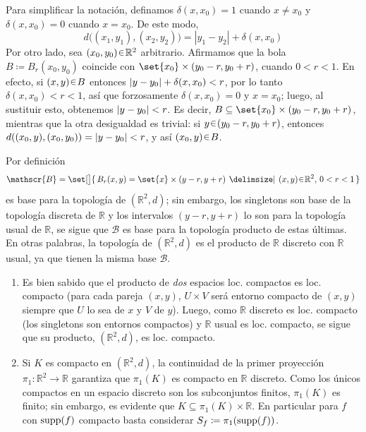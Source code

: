 \begin{sol}
Para simplificar la notación, definamos $\delta(x,x_0) = 1$ cuando $x\neq x_0$ y $\delta(x,x_0) = 0$ cuando $x=x_0$. De este modo, 
\[
d\bigl((x_1, y_1), (x_2, y_2)\bigr) = |y_1 - y_2| + \delta(x,x_0)
\]
Por otro lado, sea $(x_0,y_0)\en\mathbb{R}^2$ arbitrario. Afirmamos que la bola $B \coloneq B_{r}(x_0,y_0)$ coincide con $\set{x_0}\times(y_0-r,y_0+r)$, cuando $0<r<1$. En efecto, si $(x,y)\en B$ entonces $\abs{y-y_0} + \delta({x,x_0}) < r$, por lo tanto $\delta(x,x_0) < r < 1$, así que forzosamente $\delta(x,x_0)=0$ y $x=x_0$; luego, al sustituir esto, obtenemos $\abs{y-y_0} < r$. Es decir, $B \subseteq \set{x_0} \times (y_0-r,y_0+r)$, mientras que la otra desigualdad es trivial: si $y\en(y_0-r,y_0+r)$, entonces $d((x_0,y),(x_0,y_0)) = \abs{y-y_0} < r$, y así $(x_0,y)\en B$.\par
Por definición 
\[\mathscr{B} = \set[\big]{\,B_{r}(x,y) = \set{x} \times (y-r,y+r) \,\given\, (x,y)\en \mathbb{R}^2,\, 0<r<1\,}\] 
es base para la topología de $(\mathbb{R}^2,d)$; sin embargo, los singletons son base de la topología discreta de $\mathbb{R}$ y los intervalos $(y-r,y+r)$ lo son para la topología usual de $\mathbb{R}$, se sigue que $\mathscr{B}$ es base para la topología producto de estas últimas. En otras palabras, la topología de $(\mathbb{R}^2,d)$ es el producto de $\mathbb{R}$ discreto con $\mathbb{R}$ usual, ya que tienen la misma base $\mathscr{B}$.
\begin{enumerate}[label=(\roman*),leftmargin=1.5em]
\item %
Es bien sabido que el producto de \emph{dos} espacios loc. compactos es loc. compacto (para cada pareja $(x,y)$, $U \times V$ será entorno compacto de $(x,y)$ siempre que $U$ lo sea de $x$ y $V$ de $y$). Luego, como $\mathbb{R}$ discreto es loc. compacto (los singletons son entornos compactos) y $\mathbb{R}$ usual es loc. compacto, se sigue que su producto, $(\mathbb{R}^2,d)$, es loc. compacto.
\item %
Si $K$ es compacto en $(\mathbb{R}^2,d)$, la continuidad de la primer proyección $\pi_1 \colon \mathbb{R}^2 \to \mathbb{R}$ garantiza que $\pi_1(K)$ es compacto en $\mathbb{R}$ discreto. Como los únicos compactos en un espacio discreto son los subconjuntos finitos, $\pi_1(K)$ es finito; sin embargo, es evidente que $K \subseteq \pi_1(K) \times \mathbb{R}$. En particular para $f$ con $\operatorname{supp}(f)$ compacto basta considerar $S_f \coloneq \pi_1(\operatorname{supp}(f))$.

\end{enumerate}
\end{sol}
